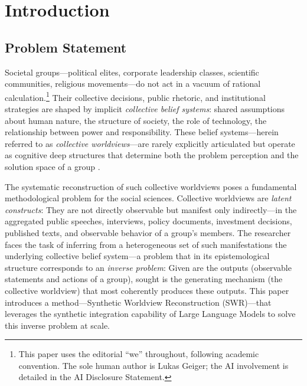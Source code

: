 \documentclass[11pt,a4paper]{article}
\theoremstyle{definition}
\theoremstyle{plain}
\theoremstyle{remark}
\begin{document}
\newpage
\setcounter{page}{1}


\section{Introduction}
\label{sec:introduction}

\subsection{Problem Statement}
\label{sec:problem}

Societal groups---political elites, corporate leadership classes, scientific communities, religious movements---do not act in a vacuum of rational calculation.\footnote{This paper uses the editorial ``we'' throughout, following academic convention. The sole human author is Lukas Geiger; the AI involvement is detailed in the AI Disclosure Statement.} Their collective decisions, public rhetoric, and institutional strategies are shaped by implicit \emph{collective belief systems}: shared assumptions about human nature, the structure of society, the role of technology, the relationship between power and responsibility. These belief systems---herein referred to as \emph{collective worldviews}---are rarely explicitly articulated but operate as cognitive deep structures that determine both the problem perception and the solution space of a group \citep{Mannheim1929, BergerLuckmann1966}.

The systematic reconstruction of such collective worldviews poses a fundamental methodological problem for the social sciences. Collective worldviews are \emph{latent constructs}: They are not directly observable but manifest only indirectly---in the aggregated public speeches, interviews, policy documents, investment decisions, published texts, and observable behavior of a group's members. The researcher faces the task of inferring from a heterogeneous set of such manifestations the underlying collective belief system---a problem that in its epistemological structure corresponds to an \emph{inverse problem}: Given are the outputs (observable statements and actions of a group), sought is the generating mechanism (the collective worldview) that most coherently produces these outputs. This paper introduces a method---Synthetic Worldview Reconstruction (SWR)---that leverages the synthetic integration capability of Large Language Models to solve this inverse problem at scale.
\end{document}
